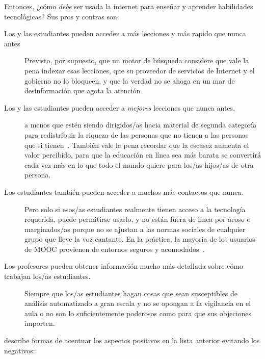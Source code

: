 Entonces, ¿cómo \emph{debe} ser usada la internet para enseñar y aprender habilidades tecnológicas?
Sus pros y contras son:

\begin{description}

\item[Los y las estudiantes pueden acceder a más lecciones y más rapido que nunca antes]
  Previsto,
  por supuesto,
  que un motor de búsqueda considere que vale la pena indexar esas lecciones,
  que su proveedor de servicios de Internet y el gobierno no lo bloqueen,
  y que la verdad no se ahoga en un mar de desinformación que agota la atención.

\item[Los y las estudiantes pueden acceder a \emph{mejores} lecciones que nunca antes,]
  a menos que estén siendo dirigidos/as hacia material de segunda categoría
  para redistribuir la riqueza de las personas que no tienen a las personas que si tienen~\cite{McMi2017}.
  También vale la pena recordar que la escasez aumenta el valor percibido,
  para que la educación en línea sea más barata
  se convertirá cada vez más en lo que todo el mundo quiere para los/as hijos/as de otra persona.

\item[Los estudiantes también pueden acceder a muchos más contactos que nunca.]
  Pero solo si esos/as estudiantes realmente tienen acceso a la tecnología requerida,
  puede permitirse usarlo,
  y no están fuera de línea por acoso o marginados/as
  porque no se ajustan a las normas sociales de cualquier grupo que lleve la voz cantante.
  En la práctica,
  la mayoría de los usuarios de MOOC provienen de entornos seguros y acomodados~\cite{Hans2015}.

\item[Los profesores pueden obtener información mucho más detallada sobre cómo trabajan los/as estudiantes.]
  Siempre que los/as estudiantes hagan cosas que sean susceptibles de análisis automatizado a gran escala
  y no se opongan a la vigilancia en el aula
  o no son lo suficientemente poderosos como para que sus objeciones importen.

\end{description}

\cite{Marg2015,Mill2016a,Nils2017} describe formas de acentuar los aspectos positivos en la lista anterior
evitando los negativos:

